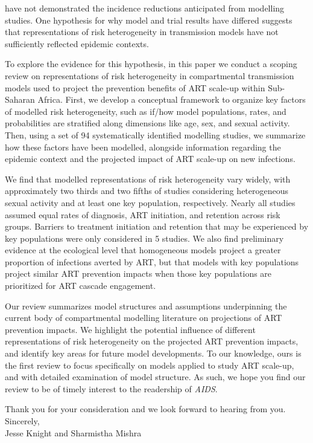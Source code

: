 \documentclass{article}
\begin{document}
have not demonstrated the incidence reductions anticipated from modelling studies.
One hypothesis for why model and trial results have differed suggests that
representations of risk heterogeneity in transmission models
have not sufficiently reflected epidemic contexts.
\par
To explore the evidence for this hypothesis, in this paper we conduct a scoping review on
representations of risk heterogeneity in compartmental transmission models
used to project the prevention benefits of ART scale-up within Sub-Saharan Africa.
First, we develop a conceptual framework to organize key factors of modelled risk heterogeneity,
such as if/how model populations, rates, and probabilities
are stratified along dimensions like age, sex, and sexual activity.
Then, using a set of 94 systematically identified modelling studies,
we summarize how these factors have been modelled, alongside information regarding
the epidemic context and the projected impact of ART scale-up on new infections.
\par
We find that modelled representations of risk heterogeneity vary widely,
with approximately two thirds and two fifths of studies considering
heterogeneous sexual activity and at least one key population, respectively.
Nearly all studies assumed equal rates of
diagnosis, ART initiation, and retention across risk groups.
Barriers to treatment initiation and retention that may be experienced by key populations
were only considered in 5 studies.
We also find preliminary evidence at the ecological level that
homogeneous models project a greater proportion of infections averted by ART,
but that models with key populations project similar ART prevention impacts
when those key populations are prioritized for ART cascade engagement.
\par
Our review summarizes model structures and assumptions underpinning
the current body of compartmental modelling literature on projections of ART prevention impacts.
We highlight the potential influence of different representations of risk heterogeneity
on the projected ART prevention impacts,
and identify key areas for future model developments.
To our knowledge, ours is the first review to focus specifically on
models applied to study ART scale-up,
and with detailed examination of model structure.
As such, we hope you find our review to be of timely interest
to the readership of \textit{AIDS}.
\par
Thank you for your consideration and we look forward to hearing from you.
\\[2em]
Sincerely,\\[1em]
Jesse Knight and Sharmistha Mishra
\end{document}
